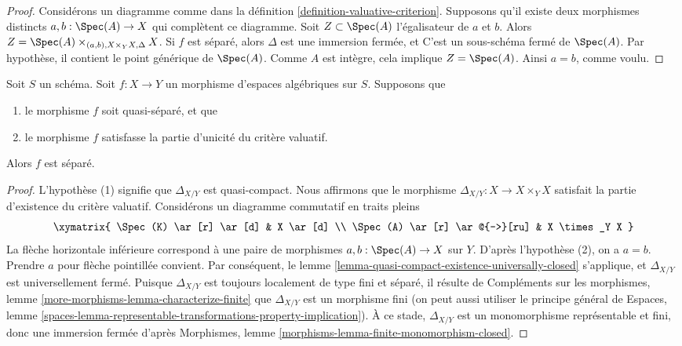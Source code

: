 \begin{proof}
Considérons un diagramme comme dans la définition \ref{definition-valuative-criterion}.
Supposons qu'il existe deux morphismes distincts
$a, b : \Spec(A) \to X$ qui complètent ce diagramme.
Soit $Z \subset \Spec(A)$ l'égalisateur de $a$ et $b$.
Alors $Z = \Spec(A) \times_{(a, b), X \times_Y X, \Delta} X$.
Si $f$ est séparé, alors $\Delta$ est une immersion fermée, et
C'est un sous-schéma fermé de $\Spec(A)$. Par hypothèse, il contient
le point générique de $\Spec(A)$. Comme $A$ est intègre,
cela implique $Z = \Spec(A)$. Ainsi $a = b$, comme voulu.
\end{proof}

\begin{lemma}
\label{lemma-valuative-criterion-separatedness}
Soit $S$ un schéma.
Soit $f : X \to Y$ un morphisme d'espaces algébriques sur $S$.
Supposons que
\begin{enumerate}
\item le morphisme $f$ soit quasi-séparé, et que
\item le morphisme $f$ satisfasse la partie d'unicité
du critère valuatif.
\end{enumerate}
Alors $f$ est séparé.
\end{lemma}

\begin{proof}
L'hypothèse (1) signifie que $\Delta_{X/Y}$ est quasi-compact.
Nous affirmons que le morphisme
$\Delta_{X/Y} : X \to X \times_Y X$ satisfait la partie d'existence
du critère valuatif.
Considérons un diagramme commutatif en traits pleins
$$
\xymatrix{
\Spec(K) \ar[r] \ar[d] & X \ar[d] \\
\Spec(A) \ar[r] \ar@{-->}[ru] & X \times_Y X
}
$$
La flèche horizontale inférieure correspond à une
paire de morphismes $a, b : \Spec(A) \to X$ sur $Y$.
D'après l'hypothèse (2), on a $a = b$. Prendre $a$ pour flèche
pointillée convient. Par conséquent, le
lemme \ref{lemma-quasi-compact-existence-universally-closed}
s'applique, et $\Delta_{X/Y}$ est universellement fermé.
Puisque $\Delta_{X/Y}$ est toujours localement de type fini et
séparé, il résulte de
Compléments sur les morphismes, lemme \ref{more-morphisms-lemma-characterize-finite}
que $\Delta_{X/Y}$ est un morphisme fini (on peut aussi utiliser le
principe général de
Espaces, lemme
\ref{spaces-lemma-representable-transformations-property-implication}).
À ce stade, $\Delta_{X/Y}$ est un monomorphisme représentable et fini,
donc une immersion fermée d'après
Morphismes, lemme \ref{morphisms-lemma-finite-monomorphism-closed}.
\end{proof}

